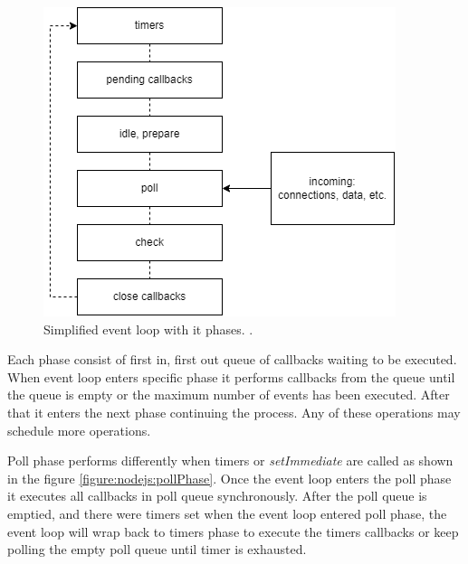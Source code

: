 \begin{figure}[htbp]
    \includegraphics[scale=0.8]{images/event_loop.png}
    \caption{Simplified event loop with it phases. \cite{node.jsEventLoop}.}
    \label{figure:nodejs:eventloop}
\end{figure}

Each phase consist of first in, first out queue of callbacks waiting to be executed.
When event loop enters specific phase it performs callbacks from the queue until the queue is empty or the maximum number of events has been executed.
After that it enters the next phase continuing the process.
Any of these operations may schedule more operations.

Poll phase performs differently when timers or \textit{setImmediate} are called as shown in the figure \ref{figure:nodejs:pollPhase}.
Once the event loop enters the poll phase it executes all callbacks in poll queue synchronously.
After the poll queue is emptied, and there were timers set when the event loop entered poll phase, the event loop will wrap back to timers phase to execute the timers callbacks or keep polling the empty poll queue until timer is exhausted.

